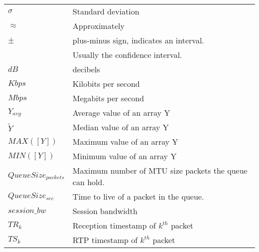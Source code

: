 \begin{longtable}{ll}
$\sigma$	& 	Standard deviation \\
$\approx$ 	& 	Approximately \\
$\pm$		& plus-minus sign, indicates an interval. \\
			& Usually the confidence interval. \\
$dB$		&	decibels \\
$Kbps$	&	Kilobits per second \\
$Mbps$	&	Megabits per second	\\
$Y_{avg}$ 	& Average value of an array Y \\
$\widetilde{Y}$ & Median value of an array Y \\
$MAX([Y])$ 	& Maximum value of an array Y \\
$MIN([Y])$ 	& Minimum value of an array Y \\
$QueueSize_{packets}$ & Maximum number of MTU size packets the queue can hold.\\
$QueueSize_{sec}$ & Time to live of a packet in the queue.\\
$session\_bw$	& Session bandwidth \\
$TR_k$ 		& 	Reception timestamp of $k^{th}$ packet \\
$TS_k$ 		& 	RTP timestamp of $k^{th}$ packet \\





\end{longtable}
